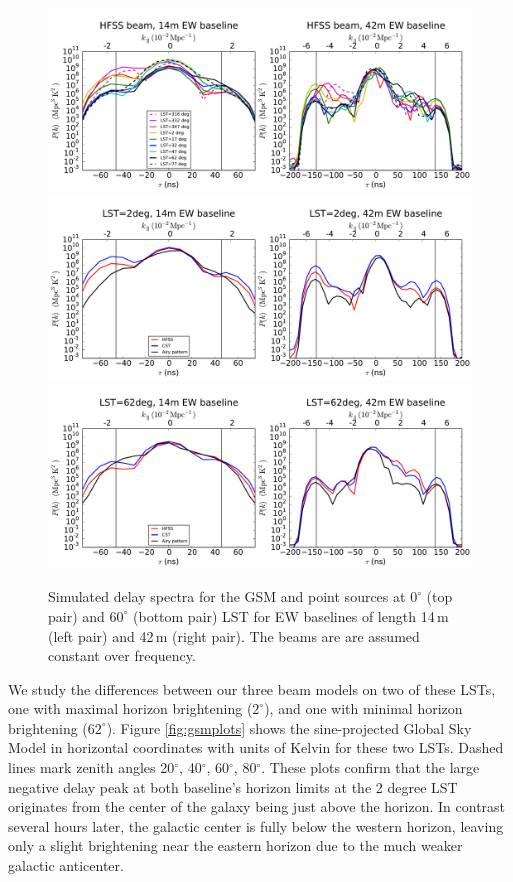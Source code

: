 \documentclass[preprint]{aastex}
\begin{document}
\begin{figure}[h]
\centering
\includegraphics[width=6in]{delay_spectra_dave_rich_airy_beams_manyLSTs.pdf}
\includegraphics[width=6in]{delay_spectra_dave_rich_airy_beams_LST2deg.pdf}
\includegraphics[width=6in]{delay_spectra_dave_rich_airy_beams_LST62deg.pdf}
\caption{Simulated delay spectra for the GSM and point sources at $0^\circ$ (top pair) and $60^\circ$ (bottom pair) LST for EW baselines of length 14\,m (left pair) and 42\,m (right pair). The beams are are assumed constant over frequency.}
\label{fig:delayspec}
\end{figure}

We study the differences between our three beam models on two of these LSTs, one with maximal horizon brightening ($2^\circ$), and one with minimal horizon brightening ($62^\circ$). Figure \ref{fig:gsmplots} shows the sine-projected Global Sky Model in horizontal coordinates with units of Kelvin for these two LSTs. Dashed lines mark zenith angles 20$^\circ$, 40$^\circ$, 60$^\circ$, 80$^\circ$. These plots confirm that the large negative delay peak at both baseline's horizon limits at the 2 degree LST originates from the center of the galaxy being just above the horizon. In contrast several hours later, the galactic center is fully below the western horizon, leaving only a slight brightening near the eastern horizon due to the much weaker galactic anticenter. 
\end{document}
